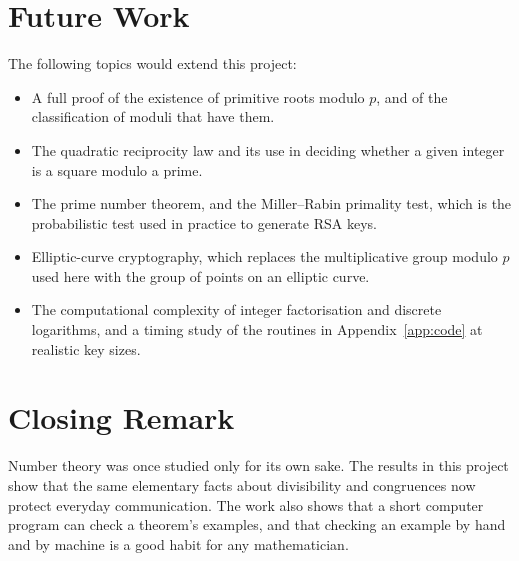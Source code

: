 \section{Future Work}

The following topics would extend this project:
\begin{itemize}
  \item A full proof of the existence of primitive roots modulo $p$, and of the classification of moduli that have them.
  \item The quadratic reciprocity law and its use in deciding whether a given integer is a square modulo a prime.
  \item The prime number theorem, and the Miller--Rabin primality test, which is the probabilistic test used in practice to generate RSA keys.
  \item Elliptic-curve cryptography, which replaces the multiplicative group modulo $p$ used here with the group of points on an elliptic curve.
  \item The computational complexity of integer factorisation and discrete logarithms, and a timing study of the routines in Appendix~\ref{app:code} at realistic key sizes.
\end{itemize}

\section{Closing Remark}

Number theory was once studied only for its own sake. The results in this project show that the same elementary facts about divisibility and congruences now protect everyday communication. The work also shows that a short computer program can check a theorem's examples, and that checking an example by hand and by machine is a good habit for any mathematician.
